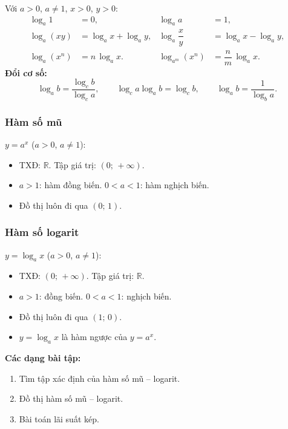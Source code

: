 \documentclass[12pt,a4paper]{article}
\begin{document}
\begin{congthuc}[title={Tính chất logarit}]
  Với $a > 0$, $a \ne 1$, $x > 0$, $y > 0$:
  \begin{align*}
    \log_a 1 &= 0, & \log_a a &= 1, \\
    \log_a(xy) &= \log_a x + \log_a y, &
    \log_a\dfrac{x}{y} &= \log_a x - \log_a y, \\
    \log_a(x^n) &= n\,\log_a x. &
    \log_{a^{m}}(x^n) &= \dfrac{n}{m}\,\log_a x.
  \end{align*}
  \textbf{Đổi cơ số:}
  \[
    \log_a b = \dfrac{\log_c b}{\log_c a},\qquad \log_c a\log_a b = \log_c b,\qquad
    \log_a b = \dfrac{1}{\log_b a}.
  \]
\end{congthuc}

\subsubsection{Hàm số mũ}

\begin{dinhnghia}
  $y = a^x$ \;($a > 0$, $a \ne 1$):
  \begin{itemize}
    \item TXĐ: $\mathbb{R}$. \quad Tập giá trị: $(0;\,+\infty)$.
    \item $a > 1$: hàm đồng biến. \quad $0 < a < 1$: hàm nghịch biến.
    \item Đồ thị luôn đi qua $(0;\,1)$.
  \end{itemize}
\end{dinhnghia}

\subsubsection{Hàm số logarit}

\begin{dinhnghia}
  $y = \log_a x$ \;($a > 0$, $a \ne 1$):
  \begin{itemize}
    \item TXĐ: $(0;\,+\infty)$. \quad Tập giá trị: $\mathbb{R}$.
    \item $a > 1$: đồng biến. \quad $0 < a < 1$: nghịch biến.
    \item Đồ thị luôn đi qua $(1;\,0)$.
    \item $y = \log_a x$ là hàm ngược của $y = a^x$.
  \end{itemize}
\end{dinhnghia}

\medskip\noindent\textbf{Các dạng bài tập:}
\begin{enumerate}[label=\textbf{Dạng \arabic*:}, leftmargin=*, align=left]
  \item Tìm tập xác định của hàm số mũ -- logarit.
  \item Đồ thị hàm số mũ -- logarit.
  \item Bài toán lãi suất kép.
\end{enumerate}
\end{document}
